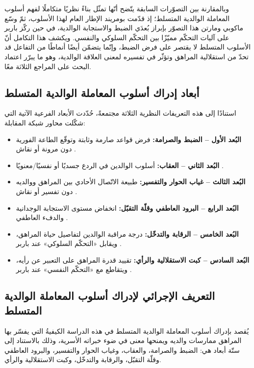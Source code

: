وبالمقارنة بين التصوّرات السابقة يتّضح أنّها تمثّل بناءً نظريًا متكاملًا لفهم أسلوب المعاملة الوالدية
المتسلط؛ إذ قدّمت بومريند الإطار العام لهذا الأسلوب، ثمّ وسّع ماكوبي ومارتن هذا التصوّر بإبراز بُعدَي
الضبط والاستجابة الوالدية، في حين ركّز باربر على آليات التحكّم مميّزًا بين التحكّم السلوكي والنفسي.
ويكشف هذا التكامل أنّ الأسلوب المتسلط لا يقتصر على فرض الضبط، وإنّما يتضمّن أيضًا أنماطًا من
التفاعل قد تحدّ من استقلالية المراهق وتؤثّر في تفسيره لمعنى العلاقة الوالدية، وهو ما يبرّر اعتماد البحث
على المراجع الثلاثة معًا.

\subsection{أبعاد إدراك أسلوب المعاملة الوالدية المتسلط}
استنادًا إلى هذه التعريفات النظرية الثلاثة مجتمعةً، حُدّدت الأبعاد الفرعية الآتية التي شكّلت محاور شبكة
المقابلة:
\begin{itemize}[leftmargin=1.6em,itemsep=1pt]
\item \textbf{البُعد الأول -- الضبط والصرامة:} فرض قواعد صارمة وثابتة وتوقّع الطاعة الفورية دون مرونة
أو نقاش .
\item \textbf{البُعد الثاني -- العقاب:} أسلوب الوالدين في الردع جسديًا أو نفسيًا/معنويًا
.
\item \textbf{البُعد الثالث -- غياب الحوار والتفسير:} طبيعة الاتّصال الأحادي بين المراهق ووالديه دون
تفسير أو نقاش .
\item \textbf{البُعد الرابع -- البرود العاطفي وقلّة التقبّل:} انخفاض مستوى الاستجابة الوجدانية والدفء
العاطفي .
\item \textbf{البُعد الخامس -- الرقابة والتدخّل:} درجة مراقبة الوالدين لتفاصيل حياة المراهق، ويقابل
«التحكّم السلوكي» عند باربر .
\item \textbf{البُعد السادس -- كبت الاستقلالية والرأي:} تقييد قدرة المراهق على التعبير عن رأيه، ويتقاطع
مع «التحكّم النفسي» عند باربر .
\end{itemize}

\subsection{التعريف الإجرائي لإدراك أسلوب المعاملة الوالدية المتسلط}
يُقصد بإدراك أسلوب المعاملة الوالدية المتسلط في هذه الدراسة الكيفيةُ التي يفسّر بها المراهق ممارسات
والديه ويمنحها معنى في ضوء خبراته الأسرية، وذلك بالاستناد إلى ستّة أبعاد هي: الضبط والصرامة،
والعقاب، وغياب الحوار والتفسير، والبرود العاطفي وقلّة التقبّل، والرقابة والتدخّل، وكبت الاستقلالية
والرأي.

